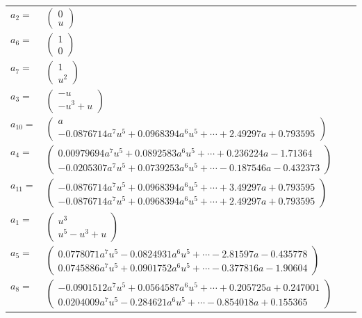\documentclass[1p]{elsarticle_modified}
\theoremstyle{definition}
\begin{document}
\begin{tabular}{m{7pt} m{180pt} m{7pt} m{180pt} }
\flushright $a_{2}=$&$\begin{pmatrix}0\\u\end{pmatrix}$ \\
\flushright $a_{6}=$&$\begin{pmatrix}1\\0\end{pmatrix}$ \\
\flushright $a_{7}=$&$\begin{pmatrix}1\\u^2\end{pmatrix}$ \\
\flushright $a_{3}=$&$\begin{pmatrix}- u\\- u^3+u\end{pmatrix}$ \\
\flushright $a_{10}=$&$\begin{pmatrix}a\\-0.0876714 a^{7} u^{5}+0.0968394 a^{6} u^{5}+\cdots+2.49297 a+0.793595\end{pmatrix}$ \\
\flushright $a_{4}=$&$\begin{pmatrix}0.00979694 a^{7} u^{5}+0.0892583 a^{6} u^{5}+\cdots+0.236224 a-1.71364\\-0.0205307 a^{7} u^{5}+0.0739253 a^{6} u^{5}+\cdots-0.187546 a-0.432373\end{pmatrix}$ \\
\flushright $a_{11}=$&$\begin{pmatrix}-0.0876714 a^{7} u^{5}+0.0968394 a^{6} u^{5}+\cdots+3.49297 a+0.793595\\-0.0876714 a^{7} u^{5}+0.0968394 a^{6} u^{5}+\cdots+2.49297 a+0.793595\end{pmatrix}$ \\
\flushright $a_{1}=$&$\begin{pmatrix}u^3\\u^5- u^3+u\end{pmatrix}$ \\
\flushright $a_{5}=$&$\begin{pmatrix}0.0778071 a^{7} u^{5}-0.0824931 a^{6} u^{5}+\cdots-2.81597 a-0.435778\\0.0745886 a^{7} u^{5}+0.0901752 a^{6} u^{5}+\cdots-0.377816 a-1.90604\end{pmatrix}$ \\
\flushright $a_{8}=$&$\begin{pmatrix}-0.0901512 a^{7} u^{5}+0.0564587 a^{6} u^{5}+\cdots+0.205725 a+0.247001\\0.0204009 a^{7} u^{5}-0.284621 a^{6} u^{5}+\cdots-0.854018 a+0.155365\end{pmatrix}$ \\

\end{tabular}
\end{document}
